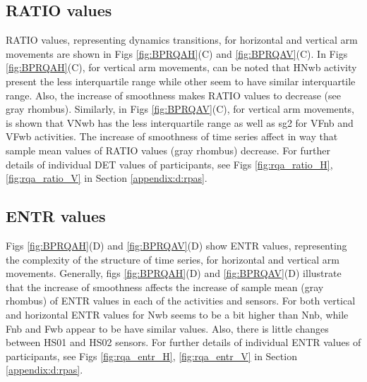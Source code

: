 \subsection*{RATIO values}
RATIO values, representing dynamics transitions, for horizontal and 
vertical arm movements are shown in Figs 
\ref{fig:BPRQAH}(C) and \ref{fig:BPRQAV}(C).
In Figs \ref{fig:BPRQAH}(C), for vertical arm movements, 
can be noted that HNwb activity
present the less interquartile range while other seem to have similar
interquartile range. Also, the increase of smoothness makes RATIO
values to decrease (see gray rhombus).
Similarly, in Figs \ref{fig:BPRQAV}(C), for vertical arm movements, 
is shown that VNwb has the less interquartile range as well as 
sg2 for VFnb and VFwb activities. 
The increase of smoothness of time series affect in way that 
sample mean values of RATIO values (gray rhombus) decrease. 
For further details of individual DET values of participants, see 
Figs \ref{fig:rqa_ratio_H}, \ref{fig:rqa_ratio_V} in
Section \ref{appendix:d:rpas}.


\subsection*{ENTR values}
Figs \ref{fig:BPRQAH}(D) and \ref{fig:BPRQAV}(D) show ENTR values, 
representing the complexity of the structure of time series, 
for horizontal and vertical arm movements.
Generally, figs \ref{fig:BPRQAH}(D) and \ref{fig:BPRQAV}(D) 
illustrate that the increase of smoothness affects the increase of 
sample mean (gray rhombus) of ENTR values in each of 
the activities and sensors. 
For both vertical and horizontal ENTR values for Nwb seems 
to be a bit higher than Nnb, while Fnb and Fwb appear to be 
have similar values.
Also, there is little changes between HS01 and HS02 sensors.
For further details of individual ENTR values of participants, see 
Figs \ref{fig:rqa_entr_H}, \ref{fig:rqa_entr_V} in
Section \ref{appendix:d:rpas}.



%


